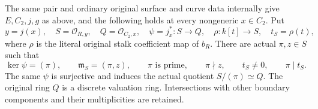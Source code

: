 \begin{theorem}
\label{thm:pl-gauss-paired-data-local-parameters}
\notready
The same pair and ordinary original surface and curve data internally
give $E,C_2,j,g$ as above, and the following holds at every nongeneric
$x\in C_2$. Put
\[
 y=j(x),\quad S=\mathcal O_{R,y},\quad Q=\mathcal O_{C_2,x},\quad
 \psi=j_x^*:S\to Q,\quad
 \rho:k[t]\to S,\quad t_S=\rho(t),
\]
where $\rho$ is the literal original stalk coefficient map of $b_R$.
There are actual $\pi,z\in S$ such that
\[
 \ker\psi=(\pi),\qquad \mathfrak m_S=(\pi,z),\qquad
 \pi\text{ is prime},\qquad \pi\nmid z,\qquad
 t_S\ne0,\qquad \pi\mid t_S.
\]
The same $\psi$ is surjective and induces the actual quotient
$S/(\pi)\simeq Q$. The original ring $Q$ is a discrete valuation
ring. Intersections with other boundary components and their
multiplicities are retained.
\end{theorem}

